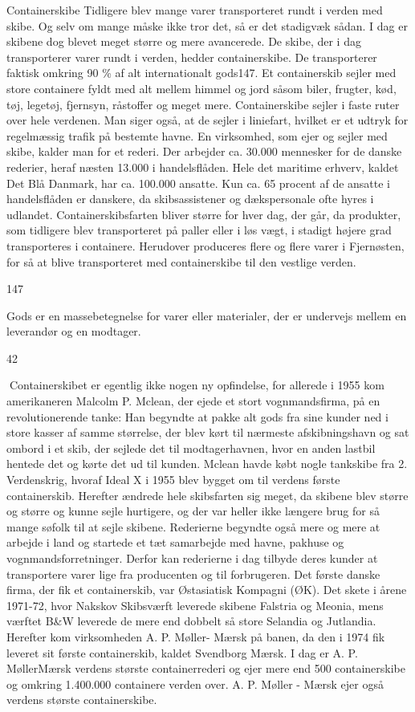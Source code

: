Containerskibe Tidligere blev mange varer transporteret rundt i verden
med skibe. Og selv om mange måske ikke tror det, så er det stadigvæk
sådan. I dag er skibene dog blevet meget større og mere avancerede. De
skibe, der i dag transporterer varer rundt i verden, hedder
containerskibe. De transporterer faktisk omkring 90 \% af alt
internationalt gods147. Et containerskib sejler med store containere
fyldt med alt mellem himmel og jord såsom biler, frugter, kød, tøj,
legetøj, fjernsyn, råstoffer og meget mere. Containerskibe sejler i
faste ruter over hele verdenen. Man siger også, at de sejler i
liniefart, hvilket er et udtryk for regelmæssig trafik på bestemte
havne. En virksomhed, som ejer og sejler med skibe, kalder man for et
rederi. Der arbejder ca. 30.000 mennesker for de danske rederier, heraf
næsten 13.000 i handelsflåden. Hele det maritime erhverv, kaldet Det Blå
Danmark, har ca. 100.000 ansatte. Kun ca. 65 procent af de ansatte i
handelsflåden er danskere, da skibsassistener og dækspersonale ofte
hyres i udlandet. Containerskibsfarten bliver større for hver dag, der
går, da produkter, som tidligere blev transporteret på paller eller i
løs vægt, i stadigt højere grad transporteres i containere. Herudover
produceres flere og flere varer i Fjernøsten, for så at blive
transporteret med containerskibe til den vestlige verden.

147

Gods er en massebetegnelse for varer eller materialer, der er undervejs
mellem en leverandør og en modtager.

42

Containerskibet er egentlig ikke nogen ny opfindelse, for allerede i
1955 kom amerikaneren Malcolm P. Mclean, der ejede et stort
vognmandsfirma, på en revolutionerende tanke: Han begyndte at pakke alt
gods fra sine kunder ned i store kasser af samme størrelse, der blev
kørt til nærmeste afskibningshavn og sat ombord i et skib, der sejlede
det til modtagerhavnen, hvor en anden lastbil hentede det og kørte det
ud til kunden. Mclean havde købt nogle tankskibe fra 2. Verdenskrig,
hvoraf Ideal X i 1955 blev bygget om til verdens første containerskib.
Herefter ændrede hele skibsfarten sig meget, da skibene blev større og
større og kunne sejle hurtigere, og der var heller ikke længere brug for
så mange søfolk til at sejle skibene. Rederierne begyndte også mere og
mere at arbejde i land og startede et tæt samarbejde med havne, pakhuse
og vognmandsforretninger. Derfor kan rederierne i dag tilbyde deres
kunder at transportere varer lige fra producenten og til forbrugeren.
Det første danske firma, der fik et containerskib, var Østasiatisk
Kompagni (ØK). Det skete i årene 1971-72, hvor Nakskov Skibsværft
leverede skibene Falstria og Meonia, mens værftet B\&W leverede de mere
end dobbelt så store Selandia og Jutlandia. Herefter kom virksomheden A.
P. Møller- Mærsk på banen, da den i 1974 fik leveret sit første
containerskib, kaldet Svendborg Mærsk. I dag er A. P. MøllerMærsk
verdens største containerrederi og ejer mere end 500 containerskibe og
omkring 1.400.000 containere verden over. A. P. Møller - Mærsk ejer også
verdens største containerskibe.
